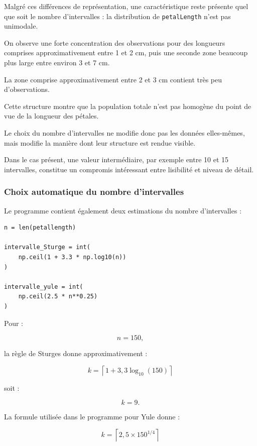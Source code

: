 \documentclass[12pt,a4paper]{article}
\begin{document}
Malgré ces différences de représentation, une caractéristique reste
présente quel que soit le nombre d'intervalles : la distribution de
\texttt{petalLength} n'est pas unimodale.

On observe une forte concentration des observations pour des longueurs
comprises approximativement entre 1 et 2 cm, puis une seconde zone
beaucoup plus large entre environ 3 et 7 cm.

La zone comprise approximativement entre 2 et 3 cm contient très peu
d'observations.

Cette structure montre que la population totale n'est pas homogène du
point de vue de la longueur des pétales.

Le choix du nombre d'intervalles ne modifie donc pas les données
elles-mêmes, mais modifie la manière dont leur structure est rendue
visible.

Dans le cas présent, une valeur intermédiaire, par exemple entre
10 et 15 intervalles, constitue un compromis intéressant entre
lisibilité et niveau de détail.


\subsubsection{Choix automatique du nombre d'intervalles}

Le programme contient également deux estimations du nombre
d'intervalles :

\begin{lstlisting}
n = len(petallength)

intervalle_Sturge = int(
    np.ceil(1 + 3.3 * np.log10(n))
)

intervalle_yule = int(
    np.ceil(2.5 * n**0.25)
)
\end{lstlisting}

Pour :

\[
n=150,
\]

la règle de Sturges donne approximativement :

\[
k =
\left\lceil
1+3,3\log_{10}(150)
\right\rceil
\]

soit :

\[
\boxed{k=9}.
\]

La formule utilisée dans le programme pour Yule donne :

\[
k =
\left\lceil
2,5\times150^{1/4}
\right\rceil
\]
\end{document}
